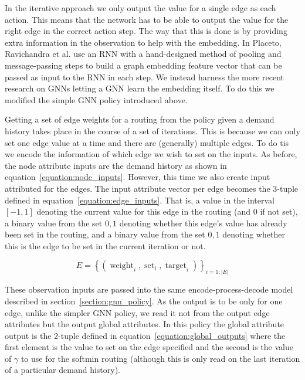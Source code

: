 In the iterative approach we only output the value for a single edge as each action. This means that the network has to be able to output the value for the right edge in the correct action step. The way that this is done is by providing extra information in the observation to help with the embedding. In Placeto, Ravichandra et al. use an RNN with a hand-designed method of pooling and message-passing steps to build a graph embedding feature vector that can be passed as input to the RNN in each step. We instead harness the more recent research on GNNs letting a GNN learn the embedding itself. To do this we modified the simple GNN policy introduced above.


Getting a set of edge weights for a routing from the policy given a demand history takes place in the course of a set of iterations. This is because we can only set one edge value at a time and there are (generally) multiple edges. To do tis we encode the information of which edge we wish to set on the inputs. As before, the node attribute inputs are the demand history as shown in equation~\ref{equation:node_inputs}. However, this time we also create input attributed for the edges. The input attribute vector per edge becomes the 3-tuple defined in equation~\ref{equation:edge_inputs}. That is, a value in the interval $[-1,1]$ denoting the current value for this edge in the routing (and 0 if not set), a binary value from the set ${0,1}$ denoting whether this edge's value has already been set in the routing, and a binary value from the set ${0,1}$ denoting whether this is the edge to be set in the current iteration or not.

\begin{equation}
  \label{equation:edge_inputs}
  E = \left\{ (\operatorname{weight}_i, \operatorname{set}_i, \operatorname{target}_i) \right\}_{i=1:|E|}
\end{equation}

These observation inputs are passed into the same encode-process-decode model described in section~\ref{section:gnn_policy}. As the output is to be only for one edge, unlike the simpler GNN policy, we read it not from the output edge attributes but the output global attributes. In this policy the global attribute output is the 2-tuple defined in equation~\ref{equation:global_outputs} where the first element is the value to set on the edge specified and the second is the value of $\gamma$ to use for the softmin routing (although this is only read on the last iteration of a particular demand history).

